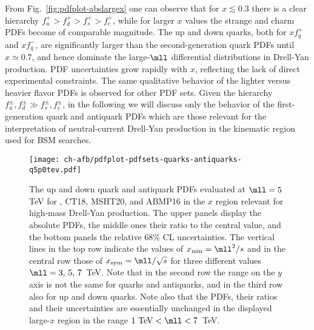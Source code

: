    From Fig.~\ref{fig:pdfplot-abslargex} one can observe that for
   $x\lesssim 0.3$ there is a clear hierarchy
$f_u^+>f_d^+ >f_s^+>f_c^+$, while for larger $x$ values the
   strange and charm PDFs become of comparable magnitude.
   The up and down quarks, both for $xf^+_q$ and $xf^-_q$, are significantly larger
   than the second-generation quark PDFs until $x\simeq 0.7$, and hence dominate the
   large-$\mll$ differential distributions in Drell-Yan production.
%
PDF uncertainties grow rapidly with $x$, reflecting the lack
of direct experimental constraints.
%
The same qualitative behavior of the lighter versus heavier flavor PDFs
is observed for other PDF sets.
%
Given the hierarchy $f_u^\pm, f_d^\pm \gg f_s^\pm, f_c^\pm $, in the following
we will discuss only the behavior of the first-generation quark
and antiquark PDFs which are those relevant for the interpretation
of neutral-current Drell-Yan production in the kinematic region used
for BSM searches. 
      


\begin{figure}[!t]
 \centering
 \texttt{[image: ch-afb/pdfplot-pdfsets-quarks-antiquarks-q5p0tev.pdf]}
 \caption{\small The up and down quark and antiquark PDFs evaluated at $\mll=5$ TeV
   for , CT18, MSHT20, and ABMP16 in the $x$ region relevant for
   high-mass Drell-Yan production. The upper panels display the absolute PDFs,
   the middle ones their ratio to the central  value, and the bottom panels
   the relative 68\% CL uncertainties.
   The vertical lines in the top
   row indicate the values of  $x_{\rm min}=\mll^2/s$ and in the central
   row those of $x_{\rm  sym}=\mll/\sqrt{s}$
   for three
   different values  $\mll=3,\,5,\,7$~TeV.
   Note that in the second row the
   range on the $y$ axis is not the same for quarks and antiquarks,
   and in the third row also for up and down quarks.
   Note also that the
   PDFs, their ratios and their uncertainties are essentially
   unchanged in the displayed large-$x$ region in the range $1~{\rm TeV}<\mll<7$~TeV.
}    
 \label{fig:mll_dep_pdfs}
\end{figure}

